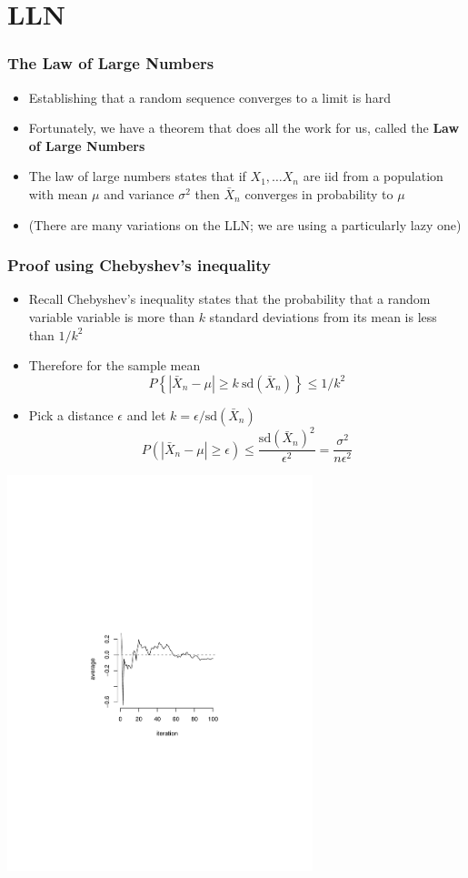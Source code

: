 \documentclass[aspectratio=169]{beamer}
\begin{document}
\section{LLN}
\begin{frame}\frametitle{The Law of Large Numbers}
  \begin{itemize}
  \item Establishing that a random sequence converges to a limit is hard
  \item Fortunately, we have a theorem that does all the work for us, called
    the {\bf Law of Large Numbers}
  \item The law of large numbers states that if $X_1,\ldots X_n$ are iid
    from a population with mean $\mu$ and variance $\sigma^2$ then $\bar
    X_n$ converges in probability to $\mu$
  \item (There are many variations on the LLN; we are using a particularly
    lazy one)
  \end{itemize}
\end{frame}

\begin{frame}\frametitle{Proof using Chebyshev's inequality}
  \begin{itemize}
  \item Recall Chebyshev's inequality states that the probability that a random variable
    variable is more than $k$ standard deviations from its mean is less than $1/k^2$
  \item Therefore for the sample mean
    $$
    P\left\{|\bar X_n - \mu| \geq k ~\mbox{sd}(\bar X_n)\right\} \leq 1 / k ^ 2
    $$
  \item Pick a distance $\epsilon$ and let $k = \epsilon / \mbox{sd}(\bar X_n)$
    $$
    P(|\bar X_n - \mu| \geq \epsilon) \leq \frac{\mbox{sd}(\bar X_n)^2}{\epsilon^2}
    = \frac{\sigma^2}{n\epsilon^2}
    $$
  \end{itemize}
\end{frame}


\begin{frame}
  \includegraphics[width=3.5in]{lln.pdf}
\end{frame}
\end{document}
